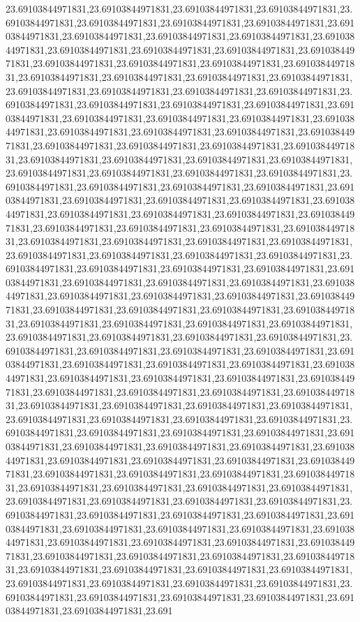 23.69103844971831,23.69103844971831,23.69103844971831,23.69103844971831,23.69103844971831,23.69103844971831,23.69103844971831,23.69103844971831,23.69103844971831,23.69103844971831,23.69103844971831,23.69103844971831,23.69103844971831,23.69103844971831,23.69103844971831,23.69103844971831,23.69103844971831,23.69103844971831,23.69103844971831,23.69103844971831,23.69103844971831,23.69103844971831,23.69103844971831,23.69103844971831,23.69103844971831,23.69103844971831,23.69103844971831,23.69103844971831,23.69103844971831,23.69103844971831,23.69103844971831,23.69103844971831,23.69103844971831,23.69103844971831,23.69103844971831,23.69103844971831,23.69103844971831,23.69103844971831,23.69103844971831,23.69103844971831,23.69103844971831,23.69103844971831,23.69103844971831,23.69103844971831,23.69103844971831,23.69103844971831,23.69103844971831,23.69103844971831,23.69103844971831,23.69103844971831,23.69103844971831,23.69103844971831,23.69103844971831,23.69103844971831,23.69103844971831,23.69103844971831,23.69103844971831,23.69103844971831,23.69103844971831,23.69103844971831,23.69103844971831,23.69103844971831,23.69103844971831,23.69103844971831,23.69103844971831,23.69103844971831,23.69103844971831,23.69103844971831,23.69103844971831,23.69103844971831,23.69103844971831,23.69103844971831,23.69103844971831,23.69103844971831,23.69103844971831,23.69103844971831,23.69103844971831,23.69103844971831,23.69103844971831,23.69103844971831,23.69103844971831,23.69103844971831,23.69103844971831,23.69103844971831,23.69103844971831,23.69103844971831,23.69103844971831,23.69103844971831,23.69103844971831,23.69103844971831,23.69103844971831,23.69103844971831,23.69103844971831,23.69103844971831,23.69103844971831,23.69103844971831,23.69103844971831,23.69103844971831,23.69103844971831,23.69103844971831,23.69103844971831,23.69103844971831,23.69103844971831,23.69103844971831,23.69103844971831,23.69103844971831,23.69103844971831,23.69103844971831,23.69103844971831,23.69103844971831,23.69103844971831,23.69103844971831,23.69103844971831,23.69103844971831,23.69103844971831,23.69103844971831,23.69103844971831,23.69103844971831,23.69103844971831,23.69103844971831,23.69103844971831,23.69103844971831,23.69103844971831,23.69103844971831,23.69103844971831,23.69103844971831,23.69103844971831,23.69103844971831,23.69103844971831,23.69103844971831,23.69103844971831,23.69103844971831,23.69103844971831,23.69103844971831,23.69103844971831,23.69103844971831,23.69103844971831,23.69103844971831,23.69103844971831,23.69103844971831,23.69103844971831,23.69103844971831,23.69103844971831,23.69103844971831,23.69103844971831,23.69103844971831,23.69103844971831,23.69103844971831,23.69103844971831,23.69103844971831,23.69103844971831,23.69103844971831,23.69103844971831,23.69103844971831,23.69103844971831,23.69103844971831,23.69103844971831,23.69103844971831,23.69103844971831,23.69103844971831,23.69103844971831,23.69103844971831,23.69103844971831,23.69103844971831,23.69103844971831,23.69103844971831,23.69103844971831,23.69103844971831,23.69103844971831,23.69103844971831,23.69103844971831,23.69103844971831,23.69103844971831,23.69103844971831,23.69103844971831,23.69103844971831,23.69103844971831,23.69103844971831,23.69103844971831,23.69103844971831,23.69103844971831,23.69103844971831,23.69103844971831,23.69103844971831,23.69103844971831,23.691